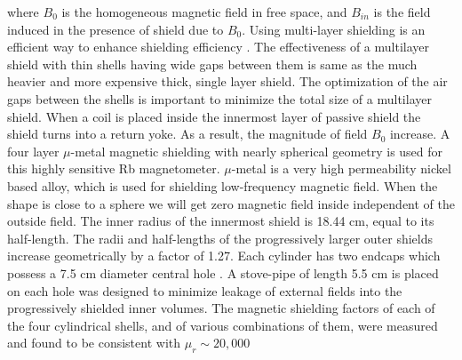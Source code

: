 where $B_0$ is the homogeneous magnetic field in free space, and $B_{in}$ is the field induced in the presence of shield due to  $B_0$. Using multi-layer shielding is an efficient way to enhance shielding efficiency \cite{doe:website2} . The effectiveness of a multilayer shield with thin shells having wide gaps between them is same as the much heavier and more expensive thick, single layer shield.
The optimization of the air gaps between the shells is important to minimize the total size of a multilayer shield. When a coil is placed inside the innermost layer of passive shield the shield turns into a return yoke. As a result, the magnitude of field $B_0$ increase. A four layer $\mu$-metal magnetic shielding with nearly spherical geometry is used for this highly sensitive Rb magnetometer. $\mu$-metal is a very high permeability nickel based alloy, which is used for shielding low-frequency magnetic field. When the shape is close to a sphere we will get zero magnetic field inside independent of the outside field. The inner radius of the innermost shield is 18.44 cm, equal to its half-length. The radii and half-lengths of the progressively larger outer shields increase geometrically by a factor of 1.27. Each cylinder has two endcaps which possess a 7.5 cm diameter central hole \cite{Andalib:2016ahj}. A stove-pipe of length 5.5 cm is placed on each hole was designed to minimize leakage of external fields into the progressively shielded inner volumes. The magnetic shielding factors of each of the four cylindrical shells, and of various combinations of them, were measured and found to be consistent with $\mu_r \sim 20, 000$ \cite{Martin:2014foa}


